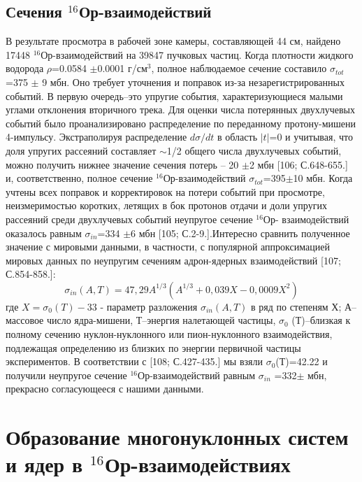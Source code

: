 \documentclass[fontsize=14pt]{scrarticle}
\begin{document}
\subsection{Сечения $^{16}$Ор-взаимодействий}
\hspace{0.6cm}
В результате просмотра в рабочей зоне камеры, составляющей 44 см,
найдено 17448 $^{16}$Ор-взаимодействий на 39847 пучковых частиц. Когда плотности жидкого водорода $\rho$=0.0584 $\pm$0.0001 г/см$^{3}$, полное наблюдаемое сечение составило $\sigma_{tot}$=375 $\pm$ 9 мбн. Оно требует уточнения и поправок из-за незарегистрированных событий. В первую очередь–это упругие события,
характеризующиеся малыми углами отклонения вторичного трека. Для
оценки числа потерянных двухлучевых событий было проанализировано
распределение по переданному протону-мишени 4-импульсу. Экстраполируя
распределение $d\sigma/dt$ в область $|t|$=0 и учитывая, что доля упругих рассеяний составляет $\sim$1/2 общего числа двухлучевых событий, можно получить нижнее значение сечения потерь – 20 $\pm$2 мбн [106; С.648-655.] и, соответственно, полное сечение $^{16}$Ор-взаимодействий $\sigma_{tot}$=395$\pm$10 мбн. Когда
учтены всех поправок и корректировок на потери событий при просмотре, неизмеримостью коротких, летящих в бок протонов отдачи и доли упругих
рассеяний среди двухлучевых событий неупругое сечение $^{16}$Ор-
взаимодействий оказалось равным $\sigma_{in}$=334 $\pm$6 мбн [105; С.2-9.].Интересно сравнить полученное значение с мировыми данными, в частности, с популярной аппроксимацией мировых данных по неупругим сечениям адрон-ядерных взаимодействий [107; С.854-858.]:
\begin{equation}
    \sigma_{in}(A,T) = 47,29 A^{1/3}(A^{1/3} + 0,039 X - 0,0009X^{2})
\end{equation}
где $X=\sigma_{0}(T)-33$ - параметр разложения $\sigma_{in}(A,T)$ в ряд по степеням Х; А–
массовое число ядра-мишени, Т–энергия налетающей частицы, $\sigma_{0}$ (Т)–близкая к полному сечению нуклон-нуклонного или
пион-нуклонного взаимодействия, подлежащая определению из близких по энергии первичной частицы экспериментов. В соответствии с [108; С.427-435.] мы взяли
$\sigma_{0}$(Т)=42.22 и получили неупругое сечение $^{16}$Ор-взаимодействий равным $\sigma_{in}$ =332$\pm$ мбн, прекрасно согласующееся с нашими данными.



\section{Образование многонуклонных систем и ядер в $^{16}$Ор-взаимодействиях}
\end{document}
